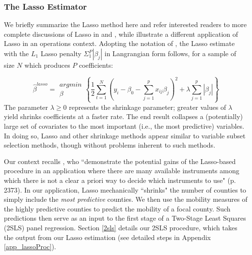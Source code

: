  \subsubsection{The Lasso Estimator} 
 We briefly summarize the Lasso method here and refer interested readers to more complete discussions of Lasso in \cite{Hastie2009} and \cite{Belloni2012}, while \cite{Fisher2020} illustrate a different application of Lasso in an operations context. Adopting the notation of \cite{Hastie2009}, the Lasso estimate with the $L_1$ Lasso penalty $\Sigma_1^P|\beta_j|$ in Langrangian form follows, for a sample of size $N$ which produces $P$ coefficients:
 
 \begin{equation} \label{eq_lasso}
     \hat{\beta}^{lasso} = \substack{argmin \\ \beta } \left\{ \frac{1}{2} \sum_{t=1}^N (y_i - \beta_0 - \sum_{j=1}^p x_{ij}\beta_j)^2 + \lambda \sum_{j=1}^p |\beta_j| \right\}
 \end{equation}
 \noindent
 The parameter $\lambda \geq 0$ represents the shrinkage parameter; greater values of $\lambda$ yield shrinks coefficients at a faster rate. The end result collapses a (potentially) large set of covariates to the most important (i.e., the most predictive) variables. In doing so, Lasso and other shrinkage methods \citep[ch. 3.4]{Hastie2009} appear similar to variable subset selection methods, though without problems inherent to such methods.
 
 Our context recalls \cite{Belloni2012}, who “demonstrate the potential gains of the Lasso-based procedure in an application where there are many available instruments among which there is not a clear a priori way to decide which instruments to use" (p. 2373). In our application, Lasso mechanically “shrinks" the number of counties to simply include the \textit{most predictive} counties. We then use the mobility measures of the highly predictive counties to predict the mobility of a focal county. Such predictions then serve as an input to the first stage of a Two-Stage Least Squares (2SLS) panel regression. Section \ref{2sls} details our 2SLS procedure, which takes the output from our Lasso estimation (see detailed steps in Appendix \ref{app_lassoProc}).
 
